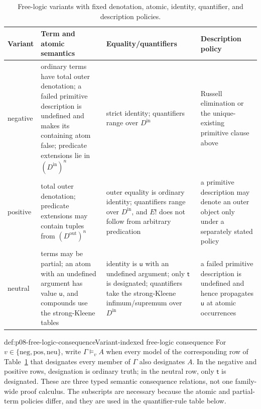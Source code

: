 \begin{table}[htbp]
\centering
\begin{tabularx}{\textwidth}{@{}l X X X@{}}
\toprule
Variant & Term and atomic semantics & Equality/quantifiers & Description policy \\
\midrule
negative & ordinary terms have total outer denotation; a failed primitive
description is undefined and makes its containing atom false; predicate
extensions lie in \((D^{\mathrm{in}})^n\) & strict
identity; quantifiers range over \(D^{\mathrm{in}}\) & Russell elimination or
the unique-existing primitive clause above \\
positive & total outer denotation; predicate extensions may contain tuples from
\((D^{\mathrm{out}})^n\) & outer equality is ordinary identity; quantifiers
range over \(D^{\mathrm{in}}\), and \(E!\) does not follow from arbitrary
predication & a primitive
description may denote an outer object only under a separately stated policy \\
neutral & terms may be partial; an atom with an undefined argument has value
\(\mathsf u\), and compounds use the strong-Kleene tables & identity is
\(\mathsf u\) with an undefined argument; only \(\mathsf t\) is designated;
quantifiers take the strong-Kleene infimum/supremum over
\(D^{\mathrm{in}}\) & a failed primitive description is undefined and hence
propagates \(\mathsf u\) at atomic occurrences \\
\bottomrule
\end{tabularx}
\caption{Free-logic variants with fixed denotation, atomic, identity,
quantifier, and description policies.}
\label{tab:p08-free-logic-variants}
\end{table}

\begin{hbdefinition}{def:p08-free-logic-consequence}{Variant-indexed free-logic consequence}
For \(v\in\{\mathrm{neg},\mathrm{pos},\mathrm{neu}\}\), write
\(\Gamma\models_v A\) when every model of the corresponding row of
Table~\ref{tab:p08-free-logic-variants} that designates every member of
\(\Gamma\) also designates \(A\).  In the negative and positive rows,
designation is ordinary truth; in the neutral row, only
\(\mathsf t\) is designated.  These are three typed semantic consequence
relations, not one family-wide proof calculus.  The subscripts are necessary
because the atomic and partial-term policies differ, and they are used in the
quantifier-rule table below.
\end{hbdefinition}


